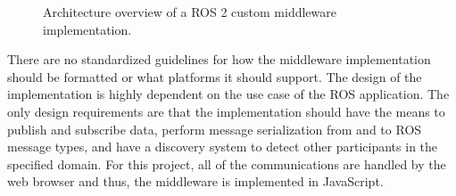         \begin{figure}[htbp]
            \centering
            \vspace{1em}
            \vspace{1em}
            \caption{Architecture overview of a \ac{ROS} 2 custom middleware implementation.}
            \label{fig:rmwarch}
        \end{figure}

        There are no standardized guidelines for how the middleware implementation should be formatted or what platforms it should support. The design of the implementation is highly dependent on the use case of the \ac{ROS} application. The only design requirements are that the implementation should have the means to publish and subscribe data, perform message serialization from and to \ac{ROS} message types, and have a discovery system to detect other participants in the specified domain. For this project, all of the communications are handled by the web browser and thus, the middleware is implemented in JavaScript.

